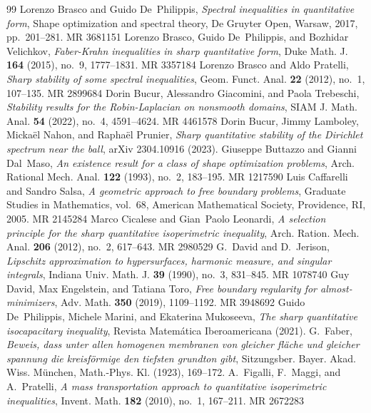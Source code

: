 \documentclass[10pt,a4paper]{amsart}
\numberwithin{equation}{section}
\providecommand{\MR}{\relax\ifhmode\unskip\space\fi MR }
\begin{document}
\begin{thebibliography}{99}
 Lorenzo Brasco and Guido De~Philippis, \emph{Spectral inequalities in quantitative form}, Shape optimization and spectral theory, De Gruyter Open, Warsaw, 2017, pp.~201--281. \MR{3681151}
 Lorenzo Brasco, Guido De~Philippis, and Bozhidar Velichkov, \emph{Faber-{K}rahn inequalities in sharp quantitative form}, Duke Math. J. \textbf{164} (2015), no.~9, 1777--1831. \MR{3357184}
 Lorenzo Brasco and Aldo Pratelli, \emph{Sharp stability of some spectral inequalities}, Geom. Funct. Anal. \textbf{22} (2012), no.~1, 107--135. \MR{2899684}
 Dorin Bucur, Alessandro Giacomini, and Paola Trebeschi, \emph{Stability results for the {R}obin-{L}aplacian on nonsmooth domains}, SIAM J. Math. Anal. \textbf{54} (2022), no.~4, 4591--4624. \MR{4461578}
 Dorin Bucur, Jimmy Lamboley, Mickaël Nahon, and Raphaël Prunier, \emph{Sharp quantitative stability of the {D}irichlet spectrum near the ball}, arXiv 2304.10916 (2023).
 Giuseppe Buttazzo and Gianni Dal~Maso, \emph{An existence result for a class of shape optimization problems}, Arch. Rational Mech. Anal. \textbf{122} (1993), no.~2, 183--195. \MR{1217590}
 Luis Caffarelli and Sandro Salsa, \emph{A geometric approach to free boundary problems}, Graduate Studies in Mathematics, vol.~68, American Mathematical Society, Providence, RI, 2005. \MR{2145284}
 Marco Cicalese and Gian~Paolo Leonardi, \emph{A selection principle for the sharp quantitative isoperimetric inequality}, Arch. Ration. Mech. Anal. \textbf{206} (2012), no.~2, 617--643. \MR{2980529}
 G.~David and D.~Jerison, \emph{Lipschitz approximation to hypersurfaces, harmonic measure, and singular integrals}, Indiana Univ. Math. J. \textbf{39} (1990), no.~3, 831--845. \MR{1078740}
 Guy David, Max Engelstein, and Tatiana Toro, \emph{Free boundary regularity for almost-minimizers}, Adv. Math. \textbf{350} (2019), 1109--1192. \MR{3948692}
 Guido De~Philippis, Michele Marini, and Ekaterina Mukoseeva, \emph{The sharp quantitative isocapacitary inequality}, Revista Matem\'{a}tica Iberoamericana (2021).
 G.~Faber, \emph{Beweis, dass unter allen homogenen membranen von gleicher fl\"{a}che und gleicher spannung die kreisf\"{o}rmige den tiefsten grundton gibt}, Sitzungsber. Bayer. Akad. Wiss. M\"{u}nchen, Math.-Phys. Kl. (1923), 169--172.
 A.~Figalli, F.~Maggi, and A.~Pratelli, \emph{A mass transportation approach to quantitative isoperimetric inequalities}, Invent. Math. \textbf{182} (2010), no.~1, 167--211. \MR{2672283}

\end{thebibliography}
\end{document}
